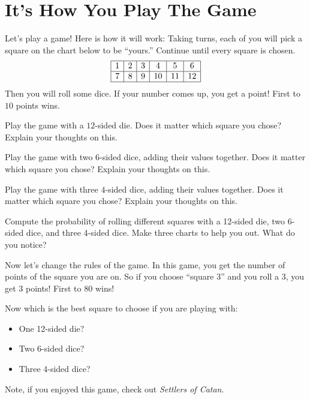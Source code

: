 \newpage
\section{It's How You Play The Game}

Let's play a game! Here is how it will work: Taking turns, each of you
will pick a square on the chart below to be ``yours.'' Continue until
every square is chosen.
\[
\begin{array}{|c|c|c|c|c|c|} \hline
1 & 2 & 3 & 4 & 5 & 6 \\ \hline
7 & 8 & 9 & 10 & 11 & 12 \\ \hline
\end{array}
\]
Then you will roll some dice. If your number comes up, you get a
point! First to $10$ points wins.


\begin{prob}
Play the game with a $12$-sided die. Does it matter which square you
chose? Explain your thoughts on this.
\end{prob}

\begin{prob}
Play the game with two $6$-sided dice, adding their values
together. Does it matter which square you chose? Explain your thoughts
on this.
\end{prob}


\begin{prob}
Play the game with three  $4$-sided dice, adding their values
together. Does it matter which square you chose? Explain your thoughts
on this.
\end{prob}


\begin{prob}
Compute the probability of rolling different squares with a 12-sided
die, two 6-sided dice, and three 4-sided dice. Make three charts to
help you out. What do you notice?
\end{prob}

Now let's change the rules of the game. In this game, you get the number of points of the square you are on. So if you choose ``square 3'' and you roll a 3, you get 3 points! First to $80$ wins!

\begin{prob}
Now which is the best square to choose if you are playing with:
\begin{itemize}
\item One 12-sided die?
\item Two 6-sided dice?
\item Three 4-sided dice?
\end{itemize}
\end{prob}

Note, if you enjoyed this game, check out \textit{Settlers of Catan}.
